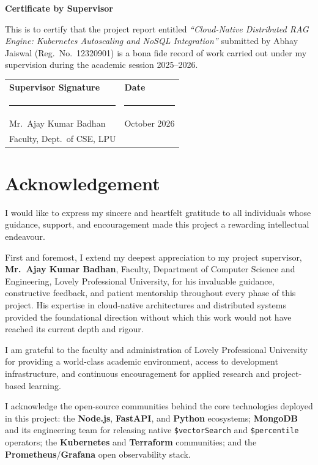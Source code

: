 \documentclass[12pt,a4paper]{report}
\begin{document}
\vspace{2cm}
\noindent\textbf{Certificate by Supervisor}

\vspace{0.5cm}
This is to certify that the project report entitled
\textit{``Cloud-Native Distributed RAG Engine: Kubernetes Autoscaling and NoSQL
Integration''} submitted by Abhay Jaiswal (Reg.\ No.\ 12320901) is a bona fide
record of work carried out under my supervision during the academic session
2025--2026.

\vspace{2cm}
\noindent
\begin{tabular}{p{6cm}p{6cm}}
  \textbf{Supervisor Signature} & \textbf{Date} \\[1.5cm]
  \rule{5cm}{0.4pt}             & \rule{5cm}{0.4pt} \\
  Mr.\ Ajay Kumar Badhan        & October 2026 \\
  Faculty, Dept.\ of CSE, LPU  & \\
\end{tabular}
\newpage


\chapter*{Acknowledgement}

I would like to express my sincere and heartfelt gratitude to all individuals
whose guidance, support, and encouragement made this project a rewarding
intellectual endeavour.

First and foremost, I extend my deepest appreciation to my project supervisor,
\textbf{Mr.\ Ajay Kumar Badhan}, Faculty, Department of Computer Science and
Engineering, Lovely Professional University, for his invaluable guidance,
constructive feedback, and patient mentorship throughout every phase of this
project. His expertise in cloud-native architectures and distributed systems
provided the foundational direction without which this work would not have
reached its current depth and rigour.

I am grateful to the faculty and administration of Lovely Professional
University for providing a world-class academic environment, access to
development infrastructure, and continuous encouragement for applied
research and project-based learning.

I acknowledge the open-source communities behind the core technologies
deployed in this project: the \textbf{Node.js}, \textbf{FastAPI}, and
\textbf{Python} ecosystems; \textbf{MongoDB} and its engineering team for
releasing native \texttt{\$vectorSearch} and \texttt{\$percentile} operators;
the \textbf{Kubernetes} and \textbf{Terraform} communities; and the
\textbf{Prometheus}/\textbf{Grafana} open observability stack.
\end{document}

